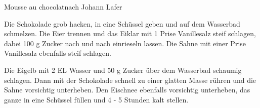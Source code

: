 \begin{recipe}{Mousse au chocolat}{nach Johann Lafer}
  \inglist
  
  \steps
  Die Schokolade grob hacken, in eine Schüssel geben und auf dem Wasserbad schmelzen. Die
  Eier trennen und das Eiklar mit 1 Prise Vanillesalz steif schlagen, dabei 100 g Zucker
  nach und nach einrieseln lassen. Die Sahne mit einer Prise Vanillesalz ebenfalls steif
  schlagen.

  Die Eigelb mit 2 EL Wasser und 50 g Zucker über dem Wasserbad schaumig schlagen. Dann
  mit der Schokolade schnell zu einer glatten Masse rühren und die Sahne vorsichtig
  unterheben. Den Eischnee ebenfalls vorsichtig unterheben, das ganze in eine Schüssel
  füllen und 4 - 5 Stunden kalt stellen. 
\end{recipe}
